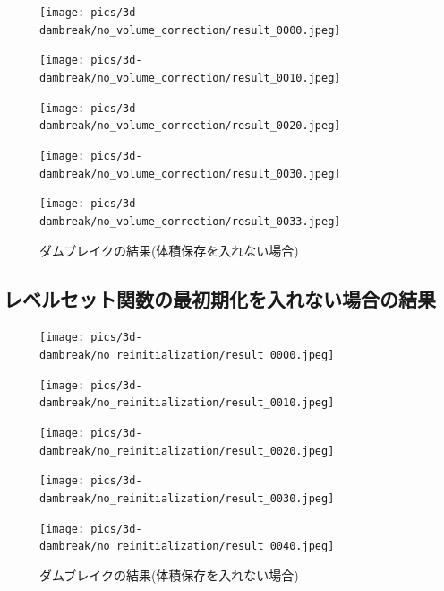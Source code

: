 \begin{figure}[H]
	\centering
	\begin{minipage}[b]{0.19\columnwidth}
	    \centering
	    \texttt{[image: pics/3d-dambreak/no\_volume\_correction/result\_0000.jpeg]}
	\end{minipage}
	\begin{minipage}[b]{0.19\columnwidth}
	    \centering
	    \texttt{[image: pics/3d-dambreak/no\_volume\_correction/result\_0010.jpeg]}
	\end{minipage}
	\begin{minipage}[b]{0.19\columnwidth}
	    \centering
	    \texttt{[image: pics/3d-dambreak/no\_volume\_correction/result\_0020.jpeg]}
	\end{minipage}
	\begin{minipage}[b]{0.19\columnwidth}
	    \centering
	    \texttt{[image: pics/3d-dambreak/no\_volume\_correction/result\_0030.jpeg]}
	\end{minipage}
	\begin{minipage}[b]{0.19\columnwidth}
	    \centering
	    \texttt{[image: pics/3d-dambreak/no\_volume\_correction/result\_0033.jpeg]}
	\end{minipage}

	\caption{ダムブレイクの結果(体積保存を入れない場合)}
	\label{fig:dambreak-result}
\end{figure}


\subsection{レベルセット関数の最初期化を入れない場合の結果}

\begin{figure}[H]
	\centering
	\begin{minipage}[b]{0.19\columnwidth}
	    \centering
	    \texttt{[image: pics/3d-dambreak/no\_reinitialization/result\_0000.jpeg]}
	\end{minipage}
	\begin{minipage}[b]{0.19\columnwidth}
	    \centering
	    \texttt{[image: pics/3d-dambreak/no\_reinitialization/result\_0010.jpeg]}
	\end{minipage}
	\begin{minipage}[b]{0.19\columnwidth}
	    \centering
	    \texttt{[image: pics/3d-dambreak/no\_reinitialization/result\_0020.jpeg]}
	\end{minipage}
	\begin{minipage}[b]{0.19\columnwidth}
	    \centering
	    \texttt{[image: pics/3d-dambreak/no\_reinitialization/result\_0030.jpeg]}
	\end{minipage}
	\begin{minipage}[b]{0.19\columnwidth}
	    \centering
	    \texttt{[image: pics/3d-dambreak/no\_reinitialization/result\_0040.jpeg]}
	\end{minipage}

	\caption{ダムブレイクの結果(体積保存を入れない場合)}
	\label{fig:dambreak-result}
\end{figure}


